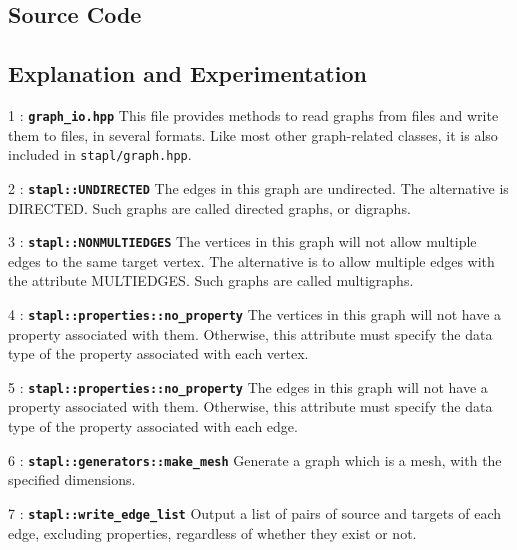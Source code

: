 \documentclass{report}
\begin{document}
\subsection{Source Code}



\subsection{Explanation and Experimentation}

\begin{hashitemize}
\item 1 : \texttt{{\bf graph\_io.hpp}}
\newline
This file provides methods to read graphs from files and write them
to files, in several formats. Like most other graph-related classes, it is also
included in \texttt{stapl/graph.hpp}.

\item 2 : \texttt{{\bf stapl::UNDIRECTED}}
\newline
The edges in this graph are undirected.  The alternative is DIRECTED.
Such graphs are called directed graphs, or digraphs.

\item 3 : \texttt{{\bf stapl::NONMULTIEDGES}}
\newline
The vertices in this graph will not allow multiple edges to the same
target vertex.  The alternative is to allow multiple edges with the
attribute MULTIEDGES.  Such graphs are called multigraphs.

\item 4 : \texttt{{\bf stapl::properties::no\_property}}
\newline
The vertices in this graph will not have a property associated with them.
Otherwise, this attribute must specify the data type of the property
associated with each vertex.

\item 5 : \texttt{{\bf stapl::properties::no\_property}}
\newline
The edges in this graph will not have a property associated with them.
Otherwise, this attribute must specify the data type of the property
associated with each edge.

\item 6 : \texttt{{\bf stapl::generators::make\_mesh}}
\newline
Generate a graph which is a mesh, with the specified dimensions.

\item 7 : \texttt{{\bf stapl::write\_edge\_list}}
\newline
Output a list of pairs of source and targets of each edge,
excluding properties, regardless of whether they exist or not.


\end{hashitemize}
\end{document}
